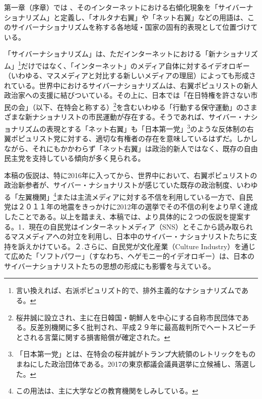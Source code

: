 \documentclass[10pt,british,A4paper,oneside]{memoir}
\begin{document}
第一章（序章）では
、そのインターネットにおける右傾化現象を「サイバーナショナリズム」と定義し、「オルタナ右翼」や「ネット右翼」などの用語は、このサイバーナショナリズムを称する各地域・国家の固有的表現として位置づけている。

「サイバーナショナリズム」は、ただインターネットにおける「新ナショナリズム」\footnote{言い換えれば、右派ポピュリズト的で、排外主義的なナショナリズムである。}だけではなく、「インターネット」のメディア自体に対するイデオロギー（いわゆる、マスメディアと対比する新しいメディアの理屈）によっても形成されている。世界中におけるサイバーナショナリズムは、右翼ポピュリストの新人政治家への支援に結びついている。その上に、日本では「在日特権を許さない市民の会」（以下、在特会と称する）\footnote{桜井誠に設立され、主に在日韓国・朝鮮人を中心にする自称市民団体である。反差別機関に多く批判され、平成２９年に最高裁判所でヘートスピーチとされる言葉に関する損害賠償が確定された。}を含むいわゆる「行動する保守運動」のさまざまな新ナショナリストの市民運動が存在する。そうであれば、サイバー・ナショナリズムの表現とする「ネット右翼」も「日本第一党」\footnote{「日本第一党」とは、在特会の桜井誠がトランプ大統領のレトリックをものまねにした政治団体である。2017の東京都議会議員選挙に立候補し、落選した。}のような反体制の右翼ポピュリスト党に対する、適切な有権者の存在を意味しているはずだ。しかしながら、それにもかかわらず「ネット右翼」は政治的新人ではなく、既存の自由民主党を支持している傾向が多く見られる。

本稿の仮説は、特に2016年に入ってから、世界中において、右翼ポピュリストの政治新参者が、サイバー・ナショナリストが感じていた既存の政治制度、いわゆる「左翼機関」\footnote{この用法は、主に大学などの教育機関をしみしている。}または主流メディアに対する不信を利用している一方で、自民党は２０１１年の地震をきっかけに2012年の選挙でその不信の利をより早く達成したことである。以上を踏まえ、本稿では、より具体的に２つの仮説を提案する。1．現在の自民党はインターネットメディア（SNS）とそこから読み取られるマスメディアへの対立を利用し、日本中のサイバー・ナショナリストたちに支持を訴えかけている。２.さらに、自民党が文化産業（Culture
Industry）を通じて広めた「ソフトパワー」（すなわち、ヘゲモニー的イデオロギー）は、日本のサイバーナショナリストたちの思想の形成にも影響を与えている。
\end{document}
